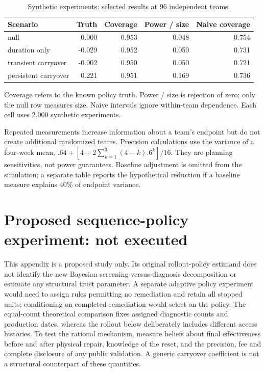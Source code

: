 \documentclass[11pt]{article}
\begin{document}
\begin{table}[ht]\centering\small
\caption{Synthetic experiments: selected results at 96 independent teams.}
\begin{tabular}{lrrrr}\toprule
Scenario & Truth & Coverage & Power / size & Naive coverage\\\midrule
null & 0.000 & 0.953 & 0.048 & 0.754\\
duration only & -0.029 & 0.952 & 0.050 & 0.731\\
transient carryover & -0.002 & 0.950 & 0.050 & 0.721\\
persistent carryover & 0.221 & 0.951 & 0.169 & 0.736\\
\bottomrule\end{tabular}
\par\smallskip\parbox{.92\linewidth}{\footnotesize Coverage refers to the known policy truth. Power / size is rejection of zero; only the null row measures size. Naive intervals ignore within-team dependence. Each cell uses 2,000 synthetic experiments.}
\end{table}
Repeated measurements increase information about a team's endpoint but do not create additional randomized teams. Precision calculations use the variance of a four-week mean, $.64+[4+2\sum_{k=1}^3(4-k).6^k]/16$. They are planning sensitivities, not power guarantees. Baseline adjustment is omitted from the simulation; a separate table reports the hypothetical reduction if a baseline measure explains 40\% of endpoint variance.

\section{Proposed sequence-policy experiment: not executed}\label{app:protocol}
This appendix is a proposed study only. Its original rollout-policy estimand does not identify the new Bayesian screening-versus-diagnosis decomposition or estimate any structural trust parameter. A separate adaptive policy experiment would need to assign rules permitting no remediation and retain all stopped units; conditioning on completed remediation would select on the policy. The equal-count theoretical comparison fixes assigned diagnostic counts and production dates, whereas the rollout below deliberately includes different access histories. To test the rational mechanism, measure beliefs about final effectiveness before and after physical repair, knowledge of the reset, and the precision, fee and complete disclosure of any public validation. A generic carryover coefficient is not a structural counterpart of these quantities.
\end{document}
